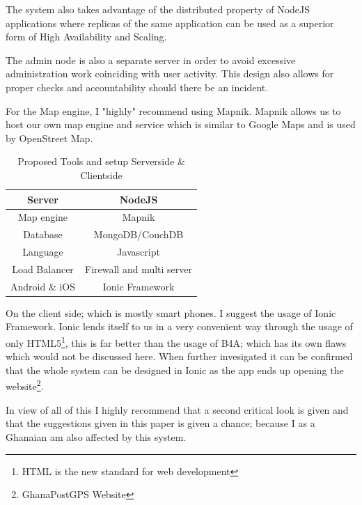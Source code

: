 \documentclass[conference,compsoc]{IEEEtran}
\begin{document}
The system also takes advantage of the distributed property of NodeJS applications where replicas of the same
application can be used as a superior form of High Availability and Scaling.
\newline

The admin node is also a separate server in order to avoid excessive administration work coinciding with user
activity. This design also allows for proper checks and accountability should there be an incident.
\newline

For the Map engine, I "highly" recommend using Mapnik\cite{mapnik:site}. Mapnik allows us to host our own map
engine and service which is similar to Google Maps and is used by OpenStreet Map\cite{openstreetmap:site}.
\newline


\begin{table}
	\renewcommand{\arraystretch}{1.5}
	\caption{Proposed Tools and setup Serverside \& Clientside}
	\label{proposed:arch}
	\centering
	\begin{tabular}{|c|c|}
		\hline
		Server & NodeJS\\
		\hline
		Map engine & Mapnik \\
		\hline
		Database & MongoDB/CouchDB\\
		\hline
		Language & Javascript \\
		\hline
		Load Balancer & Firewall and multi server \\
		\hline
		Android \& iOS & Ionic Framework \\
		\hline
	\end{tabular}
\end{table}

On the client side; which is mostly smart phones. I suggest the usage of Ionic Framework\cite{ionic:site}. Ionic
lends itself to us in a very convenient way through the usage of only HTML5\footnote{HTML is the new standard for web development}, this is far better than the usage of B4A; which has its own flaws which would not be discussed here. When further invesigated it can be confirmed that the whole system can be designed in Ionic as the
app ends up opening the website\footnote{GhanaPostGPS Website}.
\newline

In view of all of this I highly recommend that a second critical look is given and that the suggestions given
in this paper is given a chance; because I as a Ghanaian am also affected by this system.
\end{document}
